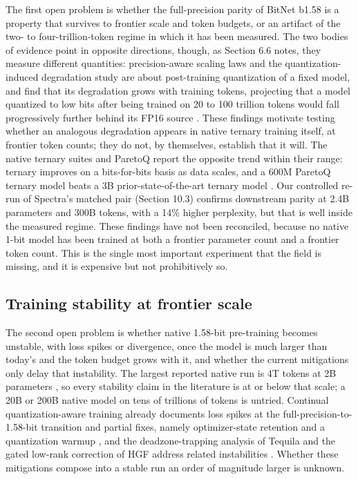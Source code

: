\documentclass[11pt]{article}
\begin{document}
The first open problem is whether the full-precision parity of BitNet b1.58 is a
property that survives to frontier scale and token budgets, or an artifact of the two-
to four-trillion-token regime in which it has been measured. The two bodies of evidence
point in opposite directions, though, as Section 6.6 notes, they measure different
quantities: precision-aware scaling laws and the quantization-induced degradation study
are about post-training quantization of a fixed model, and find that its degradation
grows with training tokens, projecting that a model quantized to low bits after being
trained on 20 to 100 trillion tokens would fall progressively further behind its FP16
source \cite{Kumar2024-ScalingLawsPrecision,Ouyang2024-QiDScaling}. These findings motivate
testing whether an analogous degradation appears in native ternary training itself, at
frontier token counts; they do not, by themselves, establish that it will. The native
ternary suites and ParetoQ report the opposite trend
within their range: ternary improves on a bits-for-bits basis as data scales, and a
600M ParetoQ ternary model beats a 3B prior-state-of-the-art ternary model
\cite{Kaushal2024-Spectra,Vaidhya2025-Spectra11,Liu2025-ParetoQ}. Our controlled re-run
of Spectra's matched pair (Section 10.3) confirms downstream parity at 2.4B parameters
and 300B tokens, with a 14\% higher perplexity, but that is well inside the measured
regime. These findings have not been reconciled, because no native 1-bit model has been
trained at both a frontier parameter count and a frontier token count. This is the single
most important experiment that the field is missing, and it is expensive but not
prohibitively so.

\subsection{Training stability at frontier scale}

The second open problem is whether native 1.58-bit pre-training becomes unstable, with
loss spikes or divergence, once the model is much larger than today's and the token
budget grows with it, and whether the current mitigations only delay that instability.
The largest reported native run is 4T tokens at 2B parameters \cite{Ma2025-BitNet2B4T}, so
every stability claim in the literature is at or below that scale; a 20B or 200B native
model on tens of trillions of tokens is untried. Continual quantization-aware training
already documents loss spikes at the full-precision-to-1.58-bit transition and partial
fixes, namely optimizer-state retention and a quantization warmup
\cite{Nielsen2025-ContinualQAT,Tu2025-Rethink1bitOpt}, and the deadzone-trapping analysis
of Tequila and the gated low-rank correction of HGF address related instabilities
\cite{Huang2025-Tequila,Anon2026-HGF}. Whether these mitigations compose into a stable run
an order of magnitude larger is unknown.
\end{document}
